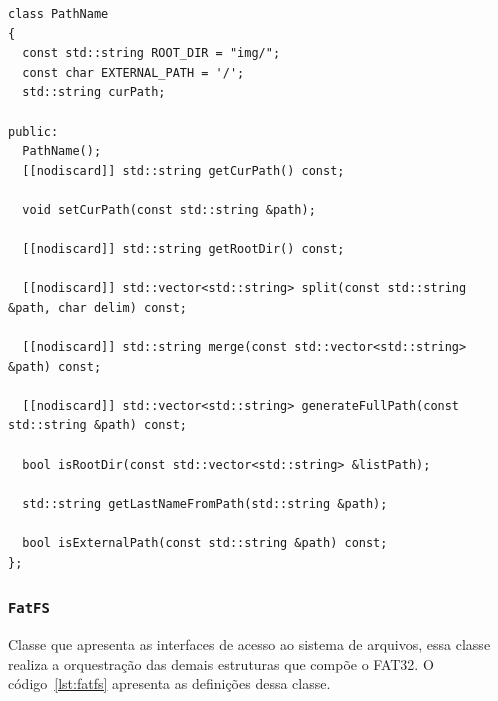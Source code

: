 \documentclass[
    12pt,				%
    oneside,   	        %
    a4paper,			%
    english,			%
    french,				%
    spanish,			%
    brazil,				%
    ]{pacotes/abntex2}
\begin{document}
\begin{lstlisting}[caption={Classe para manipulação de caminhos no sistema}, label={lst:pathname}]
class PathName
{
  const std::string ROOT_DIR = "img/";
  const char EXTERNAL_PATH = '/';
  std::string curPath;

public:
  PathName();
  [[nodiscard]] std::string getCurPath() const;
  
  void setCurPath(const std::string &path);
  
  [[nodiscard]] std::string getRootDir() const;
  
  [[nodiscard]] std::vector<std::string> split(const std::string &path, char delim) const;
  
  [[nodiscard]] std::string merge(const std::vector<std::string> &path) const;
  
  [[nodiscard]] std::vector<std::string> generateFullPath(const std::string &path) const;
  
  bool isRootDir(const std::vector<std::string> &listPath);
  
  std::string getLastNameFromPath(std::string &path);
  
  bool isExternalPath(const std::string &path) const;
};
\end{lstlisting}

\subsubsection{\texttt{FatFS}}
\label{subsubsec:fatfs}

Classe que apresenta as interfaces de acesso ao sistema de arquivos, essa classe realiza a orquestração das demais estruturas que compõe o FAT32. O código~\ref{lst:fatfs} apresenta as definições dessa classe.
\end{document}
